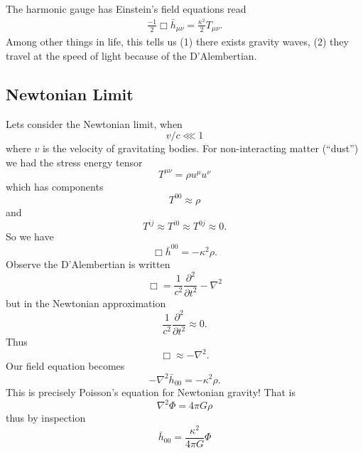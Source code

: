 The harmonic gauge has Einstein's field equations read
\begin{equation}
\begin{split}
\frac{-1}{2}\Box\bar{h}_{\mu\nu}=\frac{\kappa^{2}}{2}T_{\mu\nu}.
\end{split}
\end{equation}
Among other things in life, this tells us (1) there exists
gravity waves, (2) they travel at the speed of light because of
the D'Alembertian.

\subsection{Newtonian Limit}
Lets consider the Newtonian limit, when
\begin{equation}
v/c\lll1
\end{equation}
where $v$ is the velocity of gravitating bodies.
For non-interacting matter (``dust'') we had the stress energy
tensor
\begin{equation}
T^{\mu\nu}=\rho u^{\mu}u^{\nu}
\end{equation}
which has components
\begin{equation}
T^{00}\approx\rho
\end{equation}
and
\begin{equation}
T^{ij}\approx T^{i0}\approx T^{0j}\approx 0.
\end{equation}
So we have
\begin{equation}
\Box\bar{h}^{00}=-\kappa^{2}\rho.
\end{equation}
Observe the D'Alembertian is written
\begin{equation}
\Box=\frac{1}{c^{2}}\frac{\partial^{2}}{\partial t^{2}}
-\nabla^{2}
\end{equation}
but in the Newtonian approximation
\begin{equation}
\frac{1}{c^{2}}\frac{\partial^{2}}{\partial t^{2}}\approx0.
\end{equation}
Thus
\begin{equation}
\Box\approx-\nabla^{2}.
\end{equation}
Our field equation becomes
\begin{equation}
-\nabla^{2}\bar{h}_{00}=-\kappa^{2}\rho.
\end{equation}
This is precisely Poisson's equation for Newtonian gravity! That
is
\begin{equation}
\nabla^{2}\Phi=4\pi G\rho
\end{equation}
thus by inspection
\begin{equation}
\bar{h}_{00}=\frac{\kappa^{2}}{4\pi G}\Phi
\end{equation}
